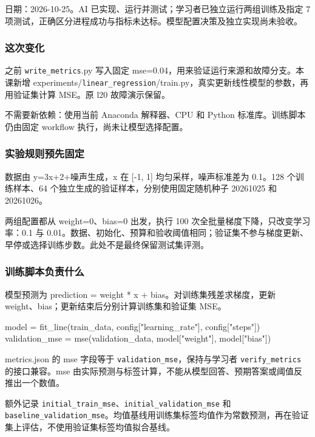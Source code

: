 \documentclass[UTF8,zihao=-4,fontset=fandol]{ctexart}
\begin{document}
日期：2026-10-25。AI 已实现、运行并测试；学习者已独立运行两组训练及指定 7 项测试，正确区分进程成功与指标未达标。模型配置决策及独立实现尚未验收。

\subsubsection{这次变化}

之前 \nolinkurl{write_metrics}.py 写入固定 mse=0.04，用来验证运行来源和故障分支。本课新增 experiments/\nolinkurl{linear_regression}/train.py，真实更新线性模型的参数，再用验证集计算 MSE。原 l20 故障演示保留。

不需要新依赖：使用当前 Anaconda 解释器、CPU 和 Python 标准库。训练脚本仍由固定 workflow 执行，尚未让模型选择配置。

\subsubsection{实验规则预先固定}

数据由 y=3x+2+噪声生成，x 在 [-1, 1] 均匀采样，噪声标准差为 0.1。128 个训练样本、64 个独立生成的验证样本，分别使用固定随机种子 20261025 和 20261026。

两组配置都从 weight=0、bias=0 出发，执行 100 次全批量梯度下降，只改变学习率：0.1 与 0.01。数据、初始化、预算和验收阈值相同；验证集不参与梯度更新、早停或选择训练步数。此处不是最终保留测试集评测。

\subsubsection{训练脚本负责什么}

模型预测为 prediction = weight * x + bias。对训练集残差求梯度，更新 weight、bias；更新结束后分别计算训练集和验证集 MSE。

\begin{Code}
model = fit_line(train_data, config["learning_rate"], config["steps"])
validation_mse = mse(validation_data, model["weight"], model["bias"])
\end{Code}

metrics.json 的 mse 字段等于 \nolinkurl{validation_mse}，保持与学习者 \nolinkurl{verify_metrics} 的接口兼容。mse 由实际预测与标签计算，不能从模型回答、预期答案或阈值反推出一个数值。

额外记录 \nolinkurl{initial_train_mse}、\nolinkurl{initial_validation_mse} 和 \nolinkurl{baseline_validation_mse}。均值基线用训练集标签均值作为常数预测，再在验证集上评估，不使用验证集标签均值拟合基线。
\end{document}
